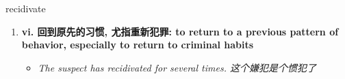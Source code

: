 
\begin{frame}
{\huge recidivate}
\begin{center}
\begin{enumerate}\Large
  \item \textbf{vi. 回到原先的习惯, 尤指重新犯罪: to return to a previous pattern of behavior, especially to return to criminal habits}
  \begin{itemize}
    \item \em{\Large{The suspect has recidivated for several times. 这个嫌犯是个惯犯了}}
  \end{itemize}
\end{enumerate}
\end{center}
\end{frame}
